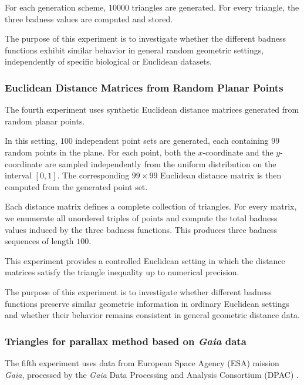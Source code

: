 \documentclass[11pt]{article}
\begin{document}
For each generation scheme, \(10000\) triangles are generated. For every triangle, the three badness values are computed and stored.

The purpose of this experiment is to investigate whether the different badness functions exhibit similar behavior in general random geometric settings, independently of specific biological or Euclidean datasets.

\subsubsection{Euclidean Distance Matrices from Random Planar Points}\label{sec:data_euclidean_points}

The fourth experiment uses synthetic Euclidean distance matrices generated from random planar points.

In this setting, \(100\) independent point sets are generated, each containing \(99\) random points in the plane. For each point, both the \(x\)-coordinate and the \(y\)-coordinate are sampled independently from the uniform distribution on the interval \([0,1]\). The corresponding \(99\times 99\) Euclidean distance matrix is then computed from the generated point set.

Each distance matrix defines a complete collection of triangles. For every matrix, we enumerate all unordered triples of points and compute the total badness values induced by the three badness functions. This produces three badness sequences of length \(100\).

This experiment provides a controlled Euclidean setting in which the distance matrices satisfy the triangle inequality up to numerical precision.

The purpose of this experiment is to investigate whether different badness functions preserve similar geometric information in ordinary Euclidean settings and whether their behavior remains consistent in general geometric distance data.

\subsubsection{Triangles for parallax method based on \textit{Gaia} data}
\label{sec:data_Gaia}

The fifth experiment uses data from European Space Agency (ESA) mission
{\it Gaia}, processed by the {\it Gaia}
Data Processing and Analysis Consortium (DPAC) \cite{prusti2016Gaia,vallenari2023Gaia}. 
\end{document}
